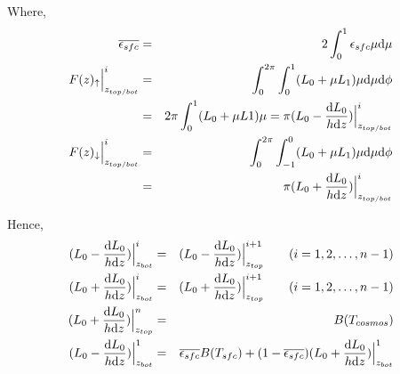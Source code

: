 \documentclass[a4paper]{report}
\begin{document}
Where,
\begin{eqnarray} \label{eq:epsilonbar}
    \overline{\epsilon_{sfc}} & = & 2\int_{0}^{1}\epsilon_{sfc}\mu \mathrm{d} \mu \nonumber\\
    F(z)_{\uparrow}\Big|_{z_{top/bot}}^{i} & = & \int_{0}^{2\pi}\int_{0}^{1}(L_{0} + \mu L_{1})\mu\mathrm{d}\mu\mathrm{d}\phi \nonumber\\
    {} & = & 2\pi\int_{0}^{1}(L_{0}+ \mu L{1})\mu = \pi (L_{0} - \frac{\mathrm{d} L_{0}}{h \mathrm{d} z})\Big|_{z_{top/bot}}^{i} \nonumber\\
    F(z)_{\downarrow}\Big|_{z_{top/bot}}^{i} & = & \int_{0}^{2\pi}\int_{-1}^{0}(L_{0} + \mu L_{1})\mu\mathrm{d}\mu\mathrm{d}\phi \nonumber\\
    {} & = & \pi (L_{0} + \frac{\mathrm{d} L_{0}}{h \mathrm{d} z})\Big|_{z_{top/bot}}^{i}
\end{eqnarray}

Hence,
\begin{eqnarray} \label{eq:boundarycondition} 
    (L_{0} - \frac{\mathrm{d} L_{0}}{h \mathrm{d} z})\Big|_{z_{bot}}^{i} & = & (L_{0} - \frac{\mathrm{d} L_{0}}{h \mathrm{d} z})\Big|_{z_{top}}^{i+1} \qquad (i=1,2,\ldots,n-1) \nonumber\\
    (L_{0} + \frac{\mathrm{d} L_{0}}{h \mathrm{d} z})\Big|_{z_{bot}}^{i} & = & (L_{0} + \frac{\mathrm{d} L_{0}}{h \mathrm{d} z})\Big|_{z_{top}}^{i+1} \qquad (i=1,2,\ldots,n-1) \nonumber\\
    (L_{0} + \frac{\mathrm{d} L_{0}}{h \mathrm{d} z})\Big|_{z_{top}}^{n} & = & B(T_{cosmos}) \nonumber\\
    (L_{0} - \frac{\mathrm{d} L_{0}}{h \mathrm{d} z})\Big|_{z_{bot}}^{1} & = & \overline{\epsilon_{sfc}} B(T_{sfc}) 
    + (1-\overline{\epsilon_{sfc}}) (L_{0} + \frac{\mathrm{d} L_{0}}{h \mathrm{d} z})\Big|_{z_{bot}}^{1}  
\end{eqnarray}
\end{document}
